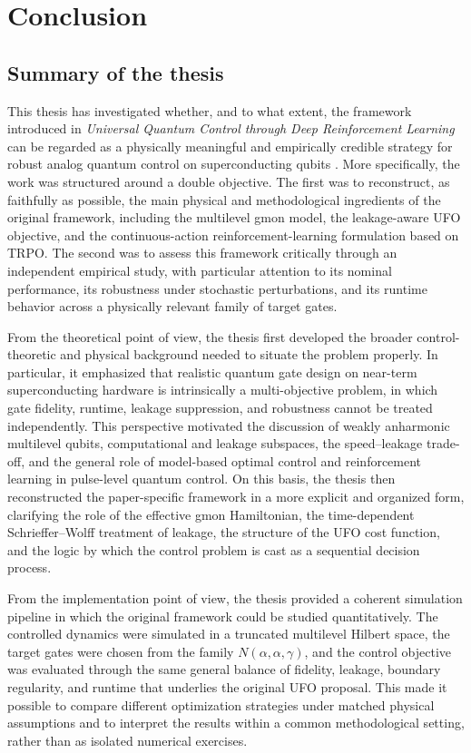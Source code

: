 \chapter{Conclusion}
\section{Summary of the thesis}
\label{sec:summary_thesis}

This thesis has investigated whether, and to what extent, the framework introduced in \emph{Universal Quantum Control through Deep Reinforcement Learning} can be regarded as a physically meaningful and empirically credible strategy for robust analog quantum control on superconducting qubits \cite{Niu2019}. More specifically, the work was structured around a double objective. The first was to reconstruct, as faithfully as possible, the main physical and methodological ingredients of the original framework, including the multilevel gmon model, the leakage-aware UFO objective, and the continuous-action reinforcement-learning formulation based on TRPO. The second was to assess this framework critically through an independent empirical study, with particular attention to its nominal performance, its robustness under stochastic perturbations, and its runtime behavior across a physically relevant family of target gates.

From the theoretical point of view, the thesis first developed the broader control-theoretic and physical background needed to situate the problem properly. In particular, it emphasized that realistic quantum gate design on near-term superconducting hardware is intrinsically a multi-objective problem, in which gate fidelity, runtime, leakage suppression, and robustness cannot be treated independently. This perspective motivated the discussion of weakly anharmonic multilevel qubits, computational and leakage subspaces, the speed--leakage trade-off, and the general role of model-based optimal control and reinforcement learning in pulse-level quantum control. On this basis, the thesis then reconstructed the paper-specific framework in a more explicit and organized form, clarifying the role of the effective gmon Hamiltonian, the time-dependent Schrieffer--Wolff treatment of leakage, the structure of the UFO cost function, and the logic by which the control problem is cast as a sequential decision process.

From the implementation point of view, the thesis provided a coherent simulation pipeline in which the original framework could be studied quantitatively. The controlled dynamics were simulated in a truncated multilevel Hilbert space, the target gates were chosen from the family \(N(\alpha,\alpha,\gamma)\), and the control objective was evaluated through the same general balance of fidelity, leakage, boundary regularity, and runtime that underlies the original UFO proposal. This made it possible to compare different optimization strategies under matched physical assumptions and to interpret the results within a common methodological setting, rather than as isolated numerical exercises.

